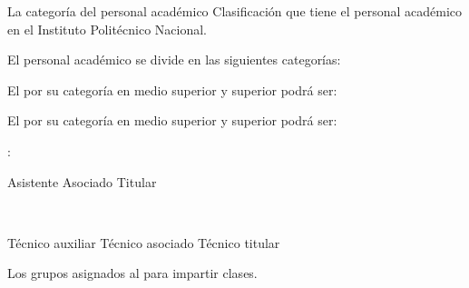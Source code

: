 \begin{bGlosario}
	  La categoría del personal académico  
	 Clasificación que tiene el personal académico en el Instituto Politécnico Nacional.
	 
	  El personal académico se divide en las siguientes categorías:\\
	 \begin{Titemize}
	 \end{Titemize}
	 
	  El  por su categoría en medio superior y superior podrá ser:\\
	 \begin{Titemize}
	 	\Titem [Asistente]
	 	\Titem [Asociado]
	 	\Titem [Titular]
	 \end{Titemize}
	 
	  El  por su categoría en medio superior y superior podrá ser:\\
	 
	 \begin{Titemize}
	 	\Titem [Superior]:\\
	 	\begin{Titemize}
	 		\Titem Asistente
	 		\Titem Asociado
	 		\Titem Titular
	 	\end{Titemize}	
	 	
	 	\Titem [Medio superior:]\\	
	 	\begin{Titemize}
	 		\Titem Técnico auxiliar
	 		\Titem Técnico asociado
	 		\Titem Técnico titular
	 	\end{Titemize}
	 \end{Titemize}
	 
	  Los grupos asignados al  para impartir clases.
	 

\end{bGlosario}
